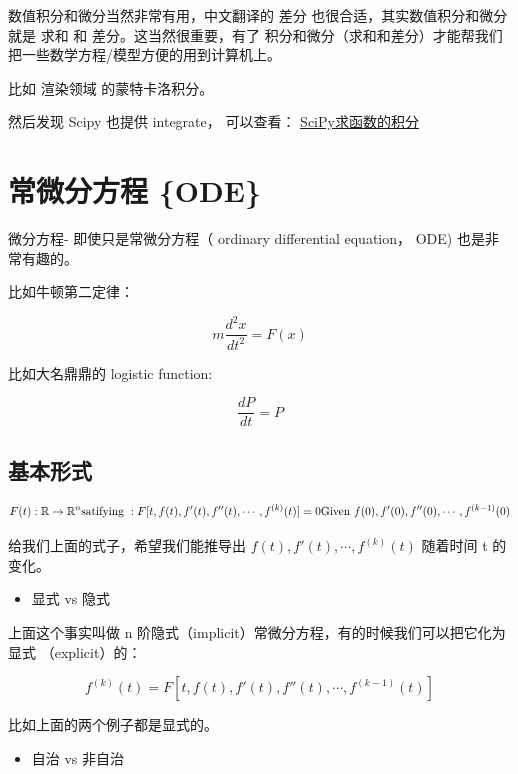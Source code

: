 \documentclass[
]{book}
\providecommand{\tightlist}{%
  \setlength{\itemsep}{0pt}\setlength{\parskip}{0pt}}
\begin{document}
数值积分和微分当然非常有用，中文翻译的 差分 也很合适，其实数值积分和微分就是 求和 和 差分。这当然很重要，有了 积分和微分（求和和差分）才能帮我们把一些数学方程/模型方便的用到计算机上。

比如 渲染领域 的蒙特卡洛积分。

然后发现 Scipy 也提供 integrate， 可以查看： \href{http://liao.cpython.org/scipy18/}{SciPy求函数的积分}

\hypertarget{ux5e38ux5faeux5206ux65b9ux7a0b-ode}{%
\chapter{常微分方程 \{ODE\}}\label{ux5e38ux5faeux5206ux65b9ux7a0b-ode}}

微分方程- 即使只是常微分方程（ ordinary differential equation， ODE) 也是非常有趣的。

比如牛顿第二定律：

\[
m\frac{d^2 x}{d t^2} = F(x)
\]

比如大名鼎鼎的 logistic function:

\[\frac{dP}{dt} = P\]

\hypertarget{ux57faux672cux5f62ux5f0f}{%
\section{基本形式}\label{ux57faux672cux5f62ux5f0f}}

\[
F(t): \mathbb{R} \to \mathbb{R}^n \\
\text{satifying }: F[t, f(t), f'(t), f''(t), \cdots, f^{(k)}(t)] = 0 \\
\text{Given } f(0), f'(0), f''(0), \cdots, f^{(k-1)}(0)
\]

给我们上面的式子，希望我们能推导出 \(f(t), f'(t), \cdots, f^{(k)}(t)\) 随着时间 t 的变化。

\begin{itemize}
\tightlist
\item
  显式 vs 隐式
\end{itemize}

上面这个事实叫做 n 阶隐式（implicit）常微分方程，有的时候我们可以把它化为显式 （explicit）的：

\[
f^{(k)}(t) = F[t, f(t), f'(t), f''(t), \cdots, f^{(k-1)}(t)] 
\]

比如上面的两个例子都是显式的。

\begin{itemize}
\tightlist
\item
  自治 vs 非自治
\end{itemize}
\end{document}
